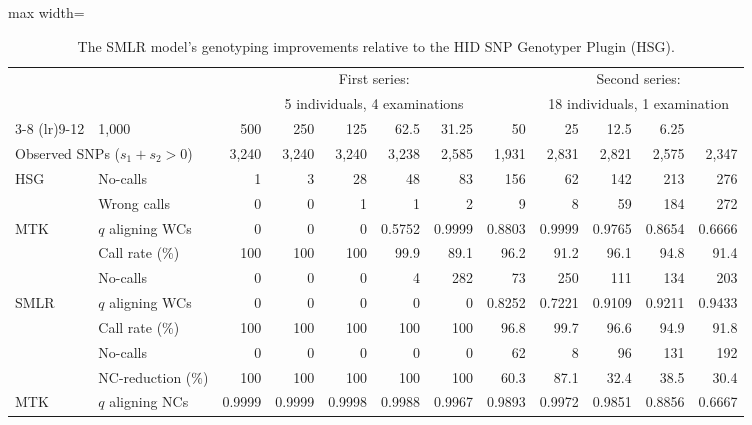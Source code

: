 \begin{table*}
\centering
\caption{The SMLR model's genotyping improvements relative to the HID SNP Genotyper Plugin (HSG).} 
\label{tab:NC_WC}
\vspace{1mm}
\begin{adjustbox}{max width=\textwidth}
\begin{threeparttable}
\begin{tabular}{llrrrrrrrrrr}
  \toprule[2pt]
\null & \null & \multicolumn{6}{c}{First series:} & \multicolumn{4}{c}{Second series:} \\
\null & \null & \multicolumn{6}{c}{5 individuals, 4 examinations} & \multicolumn{4}{c}{18 individuals, 1 examination} \\
\cmidrule(lr){3-8} \cmidrule(lr){9-12}
\multicolumn{2}{l}{DNA quantity (\si{\pg})} & 1,000 & 500 & 250 & 125 & 62.5 & 31.25 & 50 & 25 & 12.5 & 6.25 \\ 
\multicolumn{2}{l}{Observed SNPs ($s_1\!+\!s_2\!>\!0$)} & 3,240 & 3,240 & 3,240 & 3,238 & 2,585 & 1,931 & 2,831 & 2,821 & 2,575 & 2,347 \\ 
\midrule[2pt]
\multirow{2}{*}{HSG} & No-calls & 1 & 3 & 28 & 48 & 83 & 156 & 62 & 142 & 213 & 276 \\ 
   & Wrong calls & 0 & 0 & 1 & 1 & 2 & 9 & 8 & 59 & 184 & 272 \\ 
\midrule[1pt]
\midrule[1pt]
\multirow{3}{*}{MTK\tnote{$*$}}  & $q$ aligning WCs\tnote{$\dagger$} & 0 & 0 & 0 & 0.5752 & 0.9999 & 0.8803 & 0.9999 & 0.9765 & 0.8654 & 0.6666 \\ 
\cmidrule(lr){2-12}
   & Call rate (\%) & 100 & 100 & 100 & 99.9 & 89.1 & 96.2 & 91.2 & 96.1 & 94.8 & 91.4 \\ 
   & No-calls & 0 & 0 & 0 & 4 & 282 & 73 & 250 & 111 & 134 & 203 \\ 
\midrule[2pt]
\multirow{4}{*}{SMLR\tnote{$\S$}}  & $q$ aligning WCs\tnote{$\dagger$} & 0 & 0 & 0 & 0 & 0 & 0.8252 & 0.7221 & 0.9109 & 0.9211 & 0.9433 \\ 
\cmidrule(lr){2-12}
   & Call rate (\%) & 100 & 100 & 100 & 100 & 100 & 96.8 & 99.7 & 96.6 & 94.9 & 91.8 \\ 
   & No-calls & 0 & 0 & 0 & 0 & 0 & 62 & 8 & 96 & 131 & 192 \\ 
\cmidrule(lr){2-12}
   & NC-reduction (\%) & 100 & 100 & 100 & 100 & 100 & 60.3 & 87.1 & 32.4 & 38.5 & 30.4 \\ 
\midrule[1pt]
\midrule[1pt]
\multirow{3}{*}{MTK\tnote{$*$}} & $q$ aligning NCs\tnote{$\ddagger$} & 0.9999 & 0.9999 & 0.9998 & 0.9988 & 0.9967 & 0.9893 & 0.9972 & 0.9851 & 0.8856 & 0.6667 \\ 

\end{tabular}
\end{threeparttable}
\end{adjustbox}
\end{table*}
